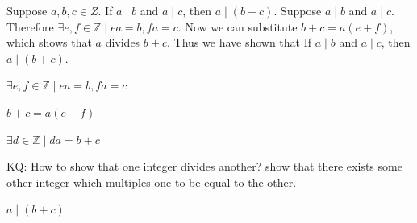 \documentclass[openany, 12pt]{book}
\begin{document}
\begin{exercise}{}{}
	Suppose $a, b, c \in Z$. If $a \mid b$ and $a \mid c$, then $a \mid(b+c)$.
	\tcblower
	Suppose $a \mid b$ and $a \mid c$. Therefore $\exists e,f\in\mathbb{Z}\mid
		ea=b, fa=c$. Now we can substitute $b+c=a(e+f)$, which shows that $a$
	divides $b+c$.  Thus we have shown that If $a \mid b$ and $a \mid c$, then
	$a \mid(b+c)$.

	\begin{alist}
		\item $\exists e,f\in\mathbb{Z}\mid ea=b, fa=c $
		\item $b+c=a(e+f)$
		\item $\exists d\in\mathbb{Z}\mid da=b+c$
		\item KQ: How to show that one integer divides another? show that there
		exists some other integer which multiples one to be equal to the
		other.
		\item $a \mid(b+c)$
	\end{alist}
\end{exercise}
\end{document}
